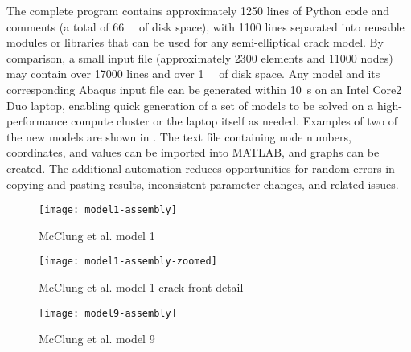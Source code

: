 The complete program contains approximately 1250 lines of Python code and comments (a total of \SI{66}{\kilo\byte} of disk space), with 1100 lines separated into reusable modules or libraries that can be used for any semi-elliptical crack model.
By comparison, a small input file (approximately \num{2300} elements and \num{11000} nodes) may contain over \num{17000} lines and over \SI{1}{\mega\byte} of disk space.
Any model and its corresponding Abaqus input file can be generated within \SI{10}{\second} on an Intel Core2 Duo laptop, enabling quick generation of a set of models to be solved on a high-performance compute cluster or the laptop itself as needed.
Examples of two of the new models are shown in .
The text file containing node numbers, coordinates, and \hone values can be imported into MATLAB, and graphs can be created.
The additional automation reduces opportunities for random errors in copying and pasting results, inconsistent parameter changes, and related issues.

  \begin{figure}
    \centering
    \texttt{[image: model1-assembly]}
    \caption{McClung et al. model 1\label{fig:model1-assembly}}
  \end{figure}
  \begin{figure}
    \centering
    \texttt{[image: model1-assembly-zoomed]}
    \caption{McClung et al. model 1 crack front detail\label{fig:model1-assembly-zoomed}}
  \end{figure}
  \begin{figure}
    \centering
    \texttt{[image: model9-assembly]}
    \caption{McClung et al. model 9\label{fig:model9-assembly}}
  \end{figure}
